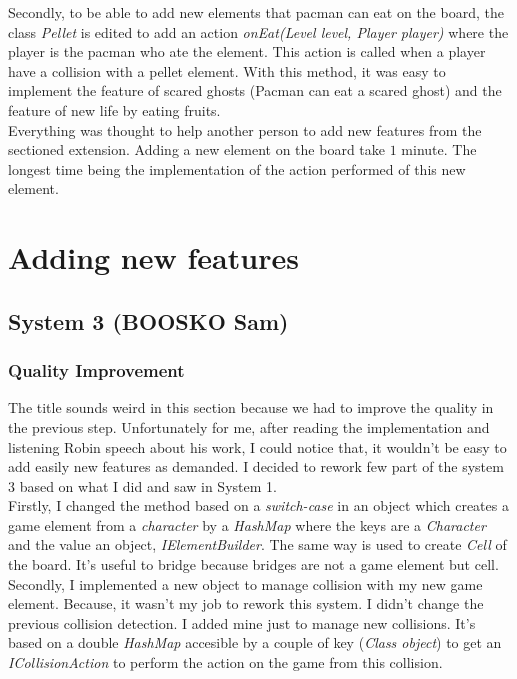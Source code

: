 \documentclass{article}
\begin{document}
Secondly, to be able to add new elements that pacman can eat on the board, the class \textit{Pellet} is edited to add an action \textit{onEat(Level level, Player player)} where the player is the pacman who ate the element. This action is called when a player have a collision with a pellet element. With this method, it was easy to implement the feature of scared ghosts (Pacman can eat a scared ghost) and the feature of new life by eating fruits.\\

Everything was thought to help another person to add new features from the sectioned extension. Adding a new element on the board take $1$ minute. The longest time being the implementation of the action performed of this new element.\\

\section{Adding new features}

\subsection{System 3 (BOOSKO Sam)}

\subsubsection{Quality Improvement}

The title sounds weird in this section because we had to improve the quality in the previous step. Unfortunately for me, after reading the implementation and listening Robin speech about his work, I could notice that, it wouldn't be easy to add easily new features as demanded. I decided to rework few part of the system 3 based on what I did and saw in System 1.\\

Firstly, I changed the method based on a \textit{switch-case} in an object which creates a game element from a \textit{character} by a \textit{HashMap} where the keys are a \textit{Character} and the value an object, \textit{IElementBuilder}. The same way is used to create \textit{Cell} of the board. It's useful to bridge because bridges are not a game element but cell.\\

Secondly, I implemented a new object to manage collision with my new game element. Because, it wasn't my job to rework this system. I didn't change the previous collision detection. I added mine just to manage new collisions. It's based on a double \textit{HashMap} accesible by a couple of key (\textit{Class object}) to get an \textit{ICollisionAction} to perform the action on the game from this collision. \\
\end{document}
